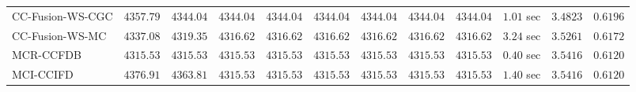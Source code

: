 \begin{table}[H]
\begin{tabular}{lrrrrrrrrrrr}
    CC-Fusion-WS-CGC & $      4357.79$ & $      4344.04$ & $      4344.04$ & $      4344.04$ & $      4344.04$ & $      4344.04$ & $      4344.04$ & $      4344.04$ & $         1.01$ sec    & $       3.4823$  & $       0.6196$ \\ 
     CC-Fusion-WS-MC & $      4337.08$ & $      4319.35$ & $      4316.62$ & $      4316.62$ & $      4316.62$ & $      4316.62$ & $      4316.62$ & $      4316.62$ & $         3.24$ sec    & $       3.5261$  & $       0.6172$ \\ 
\cmidrule{1-1} 
           MCR-CCFDB & $      4315.53$ & $      4315.53$ & $      4315.53$ & $      4315.53$ & $      4315.53$ & $      4315.53$ & $      4315.53$ & $      4315.53$ & $         0.40$ sec    & $       3.5416$  & $       0.6120$ \\ 
\cmidrule{1-1} 
           MCI-CCIFD & $      4376.91$ & $      4363.81$ & $      4315.53$ & $      4315.53$ & $      4315.53$ & $      4315.53$ & $      4315.53$ & $      4315.53$ & $         1.40$ sec    & $       3.5416$  & $       0.6120$ \\ 
\bottomrule
\end{tabular}
\end{table}

